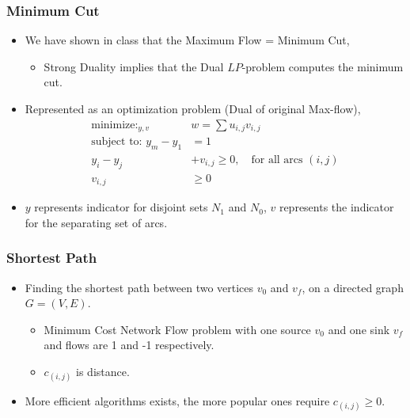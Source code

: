 \documentclass{beamer}
\begin{document}
	\begin{frame}
		\frametitle{Minimum Cut}
		\begin{itemize}
			\item We have shown in class that the Maximum Flow = Minimum Cut,
			\begin{itemize}
				\item Strong Duality implies that the Dual $LP$-problem computes the minimum cut. 
			\end{itemize} 
			\item Represented as an optimization problem (Dual of original Max-flow), 
			\begin{align*}
				\mathop{\text{minimize: }}_{y, v}  &w = \sum u_{i, j} v_{i, j}\\
				\text{subject to: } y_m - y_1 &= 1\\
				y_i - y_j &+ v_{i, j} \geq 0, \quad \text{for all arcs $(i, j)$}\\
				v_{i, j} &\geq 0
			\end{align*}
			\item $y$ represents indicator for disjoint sets $N_1$ and $N_0$, $v$ represents the indicator for the separating set of arcs. 
		\end{itemize}
	\end{frame}


	\begin{frame}
		\frametitle{Shortest Path}
		\begin{itemize}
			\item Finding the shortest path between two vertices $v_0$ and $v_f$, on a directed graph $G = (V, E)$. 
			\begin{itemize}
				\item Minimum Cost Network Flow problem with one source $v_0$ and one sink $v_f$ and flows are 1 and -1 respectively. 
				\item $c_{(i, j)}$ is distance. 
			\end{itemize}
			\vfill
			\item More efficient algorithms exists, the more popular ones require $c_{(i, j)} \geq 0$. 
		\end{itemize}
	\end{frame}
\end{document}
